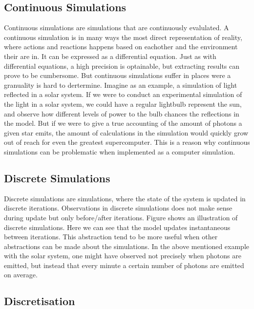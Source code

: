 \subsection{Continuous Simulations}
Continuous simulations are simulations that are continuously evalulated. A continuous simulation is in many ways the most direct representation of reality, where actions and reactions happens based on eachother and the environment their are in. It can be expressed as a differential equation. Just as with differential equations, a high precision is optainable, but extracting results can prove to be cumbersome. But continuous simulations suffer in places were a granuality is hard to dertermine. Imagine as an example, a simulation of light reflected in a solar system. If we were to conduct an experimental simulation of the light in a solar system, we could have a regular lightbulb represent the sun, and observe how different levels of power to the bulb chances the reflections in the model. But if we were to give a true accounting of the amount of photons a given star emits, the amount of calculations in the simulation would quickly grow out of reach for even the greatest supercomputer. This is a reason why continuous simulations can be problematic when implemented as a computer simulation.
\label{simulationchoise}


\subsection{Discrete Simulations}
Discrete simulations are simulations, where the state of the system is updated in discrete iterations. Observations in discrete simulations does not make sense during update but only before/after iterations. Figure  shows an illustration of discrete simulations. Here we can see that the model updates instantaneous between iterations. This abstraction tend to be more useful when other abstractions can be made about the simulations. In the above mentioned example with the solar system, one might have observed not precisely when photons are emitted, but instead that every minute a certain number of photons are emitted on average.


\subsection{Discretisation}\label{dis}


